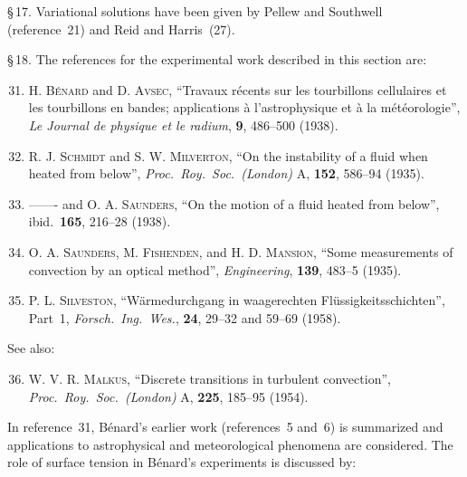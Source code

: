 \noindent \S\,17. Variational solutions have been given by Pellew and Southwell (reference~21)
and Reid and Harris~(27).

\noindent \S\,18. The references for the experimental work described in this section are:

\begin{enumerate}
\setcounter{enumi}{30}

\item \textsc{H. B\'enard} and \textsc{D. Avsec}, ``Travaux r\'ecents sur les tourbillons cellulaires
  et les tourbillons en bandes; applications \`a l'astrophysique et \`a la m\'et\'eorologie'',
  \textit{Le Journal de physique et le radium}, \textbf{9}, 486--500 (1938).

\item \textsc{R. J. Schmidt} and \textsc{S. W. Milverton}, ``On the instability of a fluid when
  heated from below'', \textit{Proc.\ Roy.\ Soc.\ (London)} A, \textbf{152}, 586--94
  (1935).

\item ------- and \textsc{O. A. Saunders}, ``On the motion of a fluid heated from below'',
  ibid.\ \textbf{165}, 216--28 (1938).

\item \textsc{O. A. Saunders}, \textsc{M. Fishenden}, and \textsc{H. D. Mansion}, ``Some measurements
  of convection by an optical method'', \textit{Engineering}, \textbf{139}, 483--5 (1935).

\item \textsc{P. L. Silveston}, ``W\"armedurchgang in waagerechten Fl\"ussigkeitsschichten'',
  Part~1, \textit{Forsch.\ Ing.\ Wes.}, \textbf{24}, 29--32 and 59--69 (1958).

\end{enumerate}

\noindent See also:

\begin{enumerate}
\setcounter{enumi}{35}

\item \textsc{W. V. R. Malkus}, ``Discrete transitions in turbulent convection'',
  \textit{Proc.\ Roy.\ Soc.\ (London)} A, \textbf{225}, 185--95 (1954).

\end{enumerate}

\noindent In reference~31, B\'enard's earlier work (references~5 and~6) is summarized and
applications to astrophysical and meteorological phenomena are considered. The
role of surface tension in B\'enard's experiments is discussed by:

